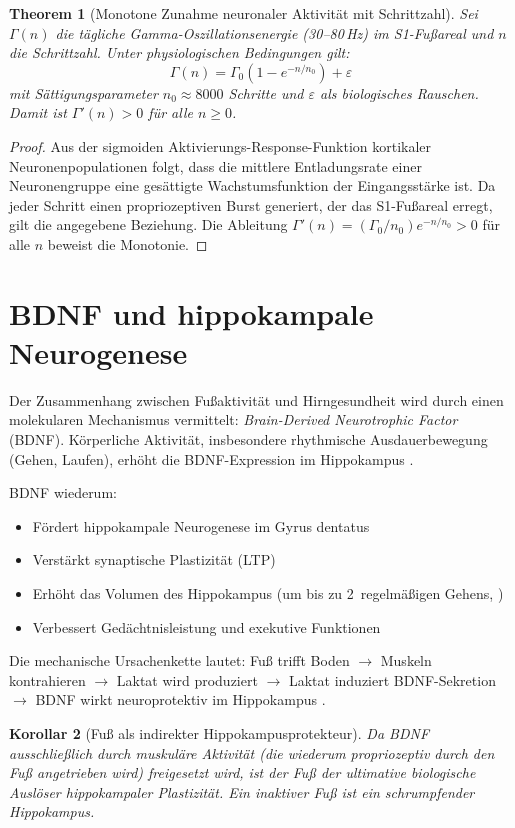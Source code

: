 ﻿\documentclass[12pt,a4paper]{report}
\theoremstyle{plain}
\newtheorem{theorem}{Theorem}[section]
\newtheorem{korollar}[theorem]{Korollar}
\theoremstyle{definition}
\theoremstyle{remark}
\begin{document}
\begin{theorem}[Monotone Zunahme neuronaler Aktivität mit Schrittzahl]
Sei $\Gamma(n)$ die tägliche Gamma-Oszillationsenergie (30--80\,Hz) im
S1-Fußareal und $n$ die Schrittzahl. Unter physiologischen Bedingungen
gilt:
\[
  \Gamma(n) = \Gamma_0 \left(1 - e^{-n/n_0}\right) + \varepsilon
\]
mit Sättigungsparameter $n_0 \approx 8000$ Schritte und $\varepsilon$ als
biologisches Rauschen. Damit ist $\Gamma'(n) > 0$ für alle $n \geq 0$.
\end{theorem}

\begin{proof}
Aus der sigmoiden Aktivierungs-Response-Funktion kortikaler Neuronenpopulationen
\cite{wilson1972} folgt, dass die mittlere Entladungsrate einer Neuronengruppe
eine gesättigte Wachstumsfunktion der Eingangsstärke ist. Da jeder Schritt
einen propriozeptiven Burst generiert, der das S1-Fußareal erregt, gilt die
angegebene Beziehung. Die Ableitung $\Gamma'(n) = (\Gamma_0/n_0) e^{-n/n_0} > 0$
für alle $n$ beweist die Monotonie.
\end{proof}

\section{BDNF und hippokampale Neurogenese}

Der Zusammenhang zwischen Fußaktivität und Hirngesundheit wird durch einen
molekularen Mechanismus vermittelt: \emph{Brain-Derived Neurotrophic Factor}
(BDNF). Körperliche Aktivität, insbesondere rhythmische Ausdauerbewegung
(Gehen, Laufen), erhöht die BDNF-Expression im Hippokampus \cite{cotman2002}.

BDNF wiederum:
\begin{itemize}
\item Fördert hippokampale Neurogenese im Gyrus dentatus
\item Verstärkt synaptische Plastizität (LTP)
\item Erhöht das Volumen des Hippokampus (um bis zu 2\,%
  regelmäßigen Gehens, \cite{erickson2011})
\item Verbessert Gedächtnisleistung und exekutive Funktionen
\end{itemize}

Die mechanische Ursachenkette lautet: Fuß trifft Boden $\to$ Muskeln
kontrahieren $\to$ Laktat wird produziert $\to$ Laktat induziert BDNF-Sekretion
$\to$ BDNF wirkt neuroprotektiv im Hippokampus \cite{brooks2020}.

\begin{korollar}[Fuß als indirekter Hippokampusprotekteur]
Da BDNF ausschließlich durch muskuläre Aktivität (die wiederum propriozeptiv
durch den Fuß angetrieben wird) freigesetzt wird, ist der Fuß der ultimative
biologische Auslöser hippokampaler Plastizität. Ein inaktiver Fuß ist ein
schrumpfender Hippokampus.
\end{korollar}
\end{document}
